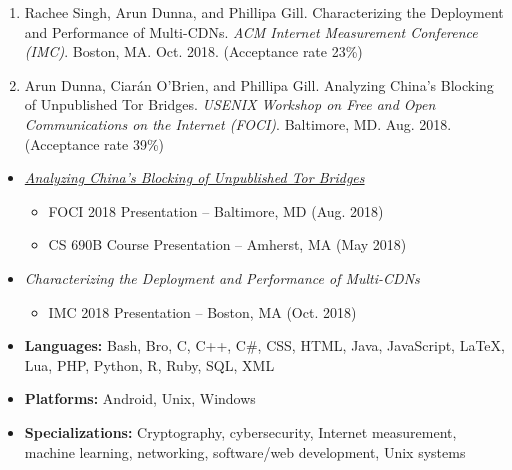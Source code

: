 
\begin{enumerate}
 \item Rachee Singh, Arun Dunna, and Phillipa Gill. Characterizing the Deployment and Performance of Multi-CDNs. \textit{ACM Internet Measurement Conference (IMC)}. Boston, MA. Oct. 2018. (Acceptance rate 23\%)
 \item Arun Dunna, Ciar\'an O'Brien, and Phillipa Gill. Analyzing China's Blocking of Unpublished Tor Bridges. \textit{USENIX Workshop on Free and Open Communications on the Internet (FOCI)}. Baltimore, MD. Aug. 2018. (Acceptance rate 39\%)
\end{enumerate}


\begin{itemize}
\item
    {\it \href{https://adunna.me/foci-2018-tor/}{Analyzing China's Blocking of Unpublished Tor Bridges}}
    \begin{itemize}
        \item FOCI 2018 Presentation -- Baltimore, MD (Aug. 2018)
        \item CS 690B Course Presentation -- Amherst, MA (May 2018)
    \end{itemize}

\item
    {\it Characterizing the Deployment and Performance of Multi-CDNs}
    \begin{itemize}
        \item IMC 2018 Presentation -- Boston, MA (Oct. 2018)
    \end{itemize}

\end{itemize}

\newpage


\begin{itemize}
\item \textbf{Languages:} Bash, Bro, C, C++, C\#, CSS, HTML, Java, JavaScript, LaTeX, Lua, PHP, Python, R, Ruby, SQL, XML
    \item \textbf{Platforms:}
Android, Unix, Windows
        \item \textbf{Specializations:}
    Cryptography, cybersecurity, Internet measurement, machine learning, networking, software/web development, Unix systems

\end{itemize}

